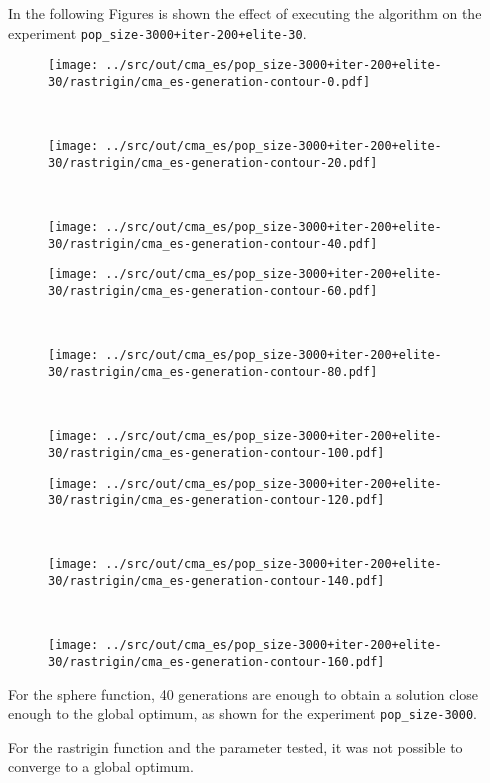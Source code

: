 In the following Figures is shown the effect of executing the algorithm on the experiment \texttt{pop\_size-3000+iter-200+elite-30}. 
\begin{figure}[H]
	\begin{minipage}[b]{.3\textwidth}
		\centering
		\texttt{[image: ../src/out/cma\_es/pop\_size-3000+iter-200+elite-30/rastrigin/cma\_es-generation-contour-0.pdf]}	
	\end{minipage}
	~
	\begin{minipage}[b]{.3\textwidth}
		\centering
		\texttt{[image: ../src/out/cma\_es/pop\_size-3000+iter-200+elite-30/rastrigin/cma\_es-generation-contour-20.pdf]}	
	\end{minipage}
	~
	\begin{minipage}[b]{.3\textwidth}
		\centering
		\texttt{[image: ../src/out/cma\_es/pop\_size-3000+iter-200+elite-30/rastrigin/cma\_es-generation-contour-40.pdf]}	
	\end{minipage}
	
	\begin{minipage}[b]{.3\textwidth}
		\centering
		\texttt{[image: ../src/out/cma\_es/pop\_size-3000+iter-200+elite-30/rastrigin/cma\_es-generation-contour-60.pdf]}	
	\end{minipage}
	~
	\begin{minipage}[b]{.3\textwidth}
		\centering
		\texttt{[image: ../src/out/cma\_es/pop\_size-3000+iter-200+elite-30/rastrigin/cma\_es-generation-contour-80.pdf]}	
	\end{minipage}
	~
	\begin{minipage}[b]{.3\textwidth}
		\centering
		\texttt{[image: ../src/out/cma\_es/pop\_size-3000+iter-200+elite-30/rastrigin/cma\_es-generation-contour-100.pdf]}	
	\end{minipage}
	
	\begin{minipage}[b]{.3\textwidth}
		\centering
		\texttt{[image: ../src/out/cma\_es/pop\_size-3000+iter-200+elite-30/rastrigin/cma\_es-generation-contour-120.pdf]}	
	\end{minipage}
	~
	\begin{minipage}[b]{.3\textwidth}
		\centering
		\texttt{[image: ../src/out/cma\_es/pop\_size-3000+iter-200+elite-30/rastrigin/cma\_es-generation-contour-140.pdf]}	
	\end{minipage}
	~
	\begin{minipage}[b]{.3\textwidth}
		\centering
		\texttt{[image: ../src/out/cma\_es/pop\_size-3000+iter-200+elite-30/rastrigin/cma\_es-generation-contour-160.pdf]}	
	\end{minipage}
	
\end{figure}

For the sphere function, 40 generations are enough to obtain a solution close enough to the global optimum, as shown for the experiment \texttt{pop\_size-3000}.

For the rastrigin function and the parameter tested, it was not possible to converge to a global optimum. 